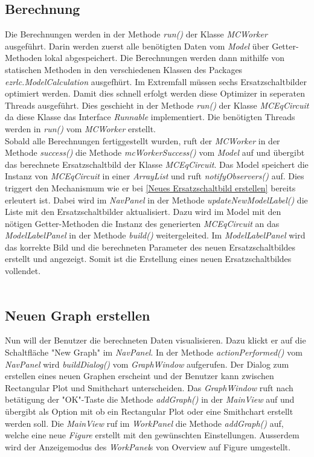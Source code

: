 \documentclass[a4paper,oneside,abstract,numbers=noenddot]{scrreprt}
\begin{document}
\subsection{Berechnung}
Die Berechnungen werden in der Methode \textit{run()} der Klasse \textit{MCWorker} ausgeführt. Darin werden zuerst alle benötigten Daten vom \textit{Model} über Getter-Methoden lokal abgespeichert. Die Berechnungen werden dann mithilfe von statischen Methoden in den verschiedenen Klassen des Packages \textit{ezrlc.ModelCalculation} ausgefhürt. Im Extremfall müssen sechs Ersatzschaltbilder optimiert werden. Damit dies schnell erfolgt werden diese Optimizer in seperaten Threads ausgeführt. Dies geschieht in der Methode \textit{run()} der Klasse \textit{MCEqCircuit} da diese Klasse das Interface \textit{Runnable} implementiert. Die benötigten Threads werden in \textit{run()} vom \textit{MCWorker} erstellt. 
\\
Sobald alle Berechnungen fertiggestellt wurden, ruft der \textit{MCWorker} in der Methode \textit{success()} die Methode \textit{mcWorkerSuccess()} vom \textit{Model} auf und übergibt das berechnete Ersatzschaltbild der Klasse \textit{MCEqCircuit}. Das Model speichert die Instanz von \textit{MCEqCircuit} in einer \textit{ArrayList} und ruft \textit{notifyObservers()} auf. Dies triggert den Mechanismum wie er bei \ref{Neues Ersatzschaltbild erstellen} bereits erleutert ist. Dabei wird im \textit{NavPanel} in der Methode \textit{updateNewModelLabel()} die Liste mit den Ersatzschaltbilder aktualisiert. Dazu wird im Model mit den nötigen Getter-Methoden die Instanz des generierten \textit{MCEqCircuit} an das \textit{ModelLabelPanel} in der Methode \textit{build()} weitergeleited. Im \textit{ModelLabelPanel} wird das korrekte Bild und die berechneten Parameter des neuen Ersatzschaltbildes erstellt und angezeigt. Somit ist die Erstellung eines neuen Ersatzschaltbildes vollendet.\\
\\
\subsection{Neuen Graph erstellen}
Nun will der Benutzer die berechneten Daten visualisieren. Dazu klickt er auf die Schaltfläche "{}New Graph"{} im \textit{NavPanel}. In der Methode \textit{actionPerformed()} vom \textit{NavPanel} wird \textit{buildDialog()} vom \textit{GraphWindow} aufgerufen. Der Dialog zum erstellen eines neuen Graphen erscheint und der Benutzer kann zwischen Rectangular Plot und Smithchart unterscheiden. Das \textit{GraphWindow} ruft nach betätigung der "{}OK"{}-Taste die Methode \textit{addGraph()} in der \textit{MainView} auf und übergibt als Option mit ob ein Rectangular Plot oder eine Smithchart erstellt werden soll. Die \textit{MainView} ruf im \textit{WorkPanel} die Methode \textit{addGraph()} auf, welche eine neue \textit{Figure} erstellt mit den gewünschten Einstellungen. Ausserdem wird der Anzeigemodus des \textit{WorkPanel}s von Overview auf Figure umgestellt. \\
\\
\end{document}

